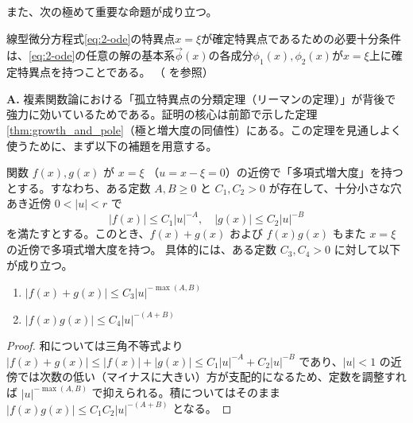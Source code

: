 また、次の極めて重要な命題が成り立つ。

\begin{proposition}\label{prop:equivalence_regular_singular}
    線型微分方程式\eqref{eq:2-ode}の特異点$x=\xi$が確定特異点であるための必要十分条件は、\eqref{eq:2-ode}の任意の解の基本系$\vec{\phi}(x)$の各成分$\phi_{1}(x),\phi_{2}(x)$が$x=\xi$上に確定特異点を持つことである。
    （\cite[p.61 命題2.6]{book:okamoto} を参照）
\end{proposition}

\begin{Q}
\textbf{A.} 複素関数論における「孤立特異点の分類定理（リーマンの定理）」が背後で強力に効いているためである。証明の核心は前節で示した定理\ref{thm:growth_and_pole}（極と増大度の同値性）にある。この定理を見通しよく使うために、まず以下の補題を用意する。
\end{Q}

\begin{lemma}[多項式増大度の和と積]\label{lem:polynomial_growth_closure}
関数 $f(x), g(x)$ が $x=\xi$ （$u = x-\xi = 0$）の近傍で「多項式増大度」を持つとする。すなわち、ある定数 $A, B \ge 0$ と $C_1, C_2 > 0$ が存在して、十分小さな穴あき近傍 $0 < |u| < r$ で
\[
|f(x)| \le C_1|u|^{-A}, \quad |g(x)| \le C_2|u|^{-B}
\]
を満たすとする。このとき、$f(x)+g(x)$ および $f(x)g(x)$ もまた $x=\xi$ の近傍で多項式増大度を持つ。
具体的には、ある定数 $C_3, C_4 > 0$ に対して以下が成り立つ。
\begin{enumerate}
    \item $|f(x)+g(x)| \le C_3|u|^{-\max(A, B)}$
    \item $|f(x)g(x)| \le C_4|u|^{-(A+B)}$
\end{enumerate}
\end{lemma}

\begin{proof}
和については三角不等式より $|f(x)+g(x)| \le |f(x)| + |g(x)| \le C_1|u|^{-A} + C_2|u|^{-B}$ であり、$|u|<1$ の近傍では次数の低い（マイナスに大きい）方が支配的になるため、定数を調整すれば $|u|^{-\max(A, B)}$ で抑えられる。積についてはそのまま $|f(x)g(x)| \le C_1 C_2 |u|^{-(A+B)}$ となる。
\end{proof}

